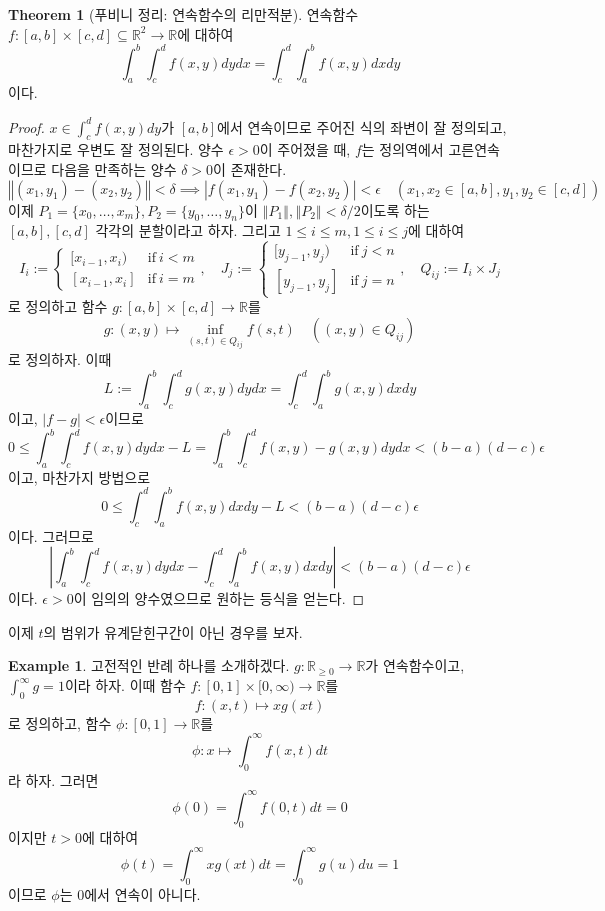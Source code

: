 \documentclass[11pt]{book}
\numberwithin{equation}{chapter}
\def\RR{\mathbb{R}}
\def\eps{\epsilon}
\newcommand{\abs}[1]{\left\vert#1\right\vert}
\newcommand{\norm}[1]{\left\Vert#1\right\Vert}
\def\textif{\text{if}}
\theoremstyle{definition}
\newtheorem{thm}{Theorem}[section]
\newtheorem*{ex}{Example}
\begin{document}
\begin{thm}[푸비니 정리: 연속함수의 리만적분]
    연속함수 \(f : [a, b] \times [c, d] \subseteq \RR^2 \to \RR\)에 대하여
    \[
    \int_a^b \int_c^d f(x, y) dydx = \int_c^d \int_a^b f(x,y)dxdy    
    \]
    이다.
\end{thm}
\begin{proof}
    \(x \in \int_c^d f(x, y) dy\)가 \([a, b]\)에서 연속이므로 주어진 식의 좌변이 잘 정의되고, 마찬가지로 우변도 잘 정의된다. 양수 \(\eps > 0\)이 주어졌을 때, \(f\)는 정의역에서 고른연속이므로 다음을 만족하는 양수 \(\delta > 0\)이 존재한다.
    \[
    \norm{(x_1, y_1) - (x_2, y_2)} < \delta \implies \abs{f(x_1, y_1) - f(x_2, y_2)} < \eps \quad (x_1, x_2 \in [a, b], y_1, y_2 \in [c, d])
    \]
    이제 \(P_1 = \{x_0, \ldots, x_m\}, P_2 = \{y_0, \ldots, y_n\}\)이 \(\norm{P_1}, \norm{P_2} < \delta/2\)이도록 하는 \([a, b], [c, d]\) 각각의 분할이라고 하자. 그리고 \(1 \le i \le m, 1 \le i \le j\)에 대하여
    \[
    I_i := \begin{cases}
        [x_{i-1}, x_i) &\textif \ i < m\\
        [x_{i-1}, x_i] &\textif \ i = m
    \end{cases}, \quad
    J_j := \begin{cases}
        [y_{j-1}, y_j) &\textif \ j < n\\
        [y_{j-1}, y_j] &\textif \ j = n
    \end{cases}, \quad Q_{ij} := I_i \times J_j
    \]
    로 정의하고 함수 \(g : [a, b] \times [c, d]  \to \RR\)를
    \[
    g : (x, y) \mapsto \inf_{(s, t) \in Q_{ij}} f(s, t) \quad ((x, y) \in Q_{ij})
    \]
    로 정의하자. 이때
    \[
        L := \int_a^b \int_c^d g(x, y) dydx = \int_c^d \int_a^b g(x,y)dxdy
    \]
    이고, \(\abs{f - g} < \eps\)이므로
    \[
        0 \le \int_a^b \int_c^d f(x, y) dy dx - L = \int_a^b \int_c^d {f(x, y) - g(x, y)} dydx < (b-a)(d-c)\eps
    \]
    이고, 마찬가지 방법으로
    \[
        0 \le {\int_c^d \int_a^b f(x, y) dxdy - L} < (b-a)(d-c)\eps
    \]
    이다. 그러므로
    \[
        \abs{\int_a^b \int_c^d f(x, y) dy dx - \int_c^d \int_a^b f(x, y) dxdy} < (b-a)(d-c)\eps
    \]
    이다. \(\eps > 0\)이 임의의 양수였으므로 원하는 등식을 얻는다.
\end{proof}

이제 \(t\)의 범위가 유계닫힌구간이 아닌 경우를 보자. 

\begin{ex}
    고전적인 반례 하나를 소개하겠다. \(g : \RR_{\ge 0} \to \RR\)가 연속함수이고, \(\int_0^{\infty} g = 1\)이라 하자. 이때 함수 \(f : [0, 1] \times [0, \infty) \to \RR\)를
    \[
    f : (x, t) \mapsto x g(xt)    
    \]
    로 정의하고, 함수 \(\phi : [0, 1] \to \RR\)를
    \[
    \phi : x \mapsto \int_0^\infty f(x, t) dt
    \]
    라 하자. 그러면
    \[
    \phi(0) = \int_0^{\infty} f(0, t) dt = 0    
    \]
    이지만 \(t > 0\)에 대하여
    \[
    \phi(t) = \int_0^\infty x g(xt) dt = \int_0^\infty g(u) du = 1
    \]
    이므로 \(\phi\)는 0에서 연속이 아니다.
\end{ex}
\end{document}
